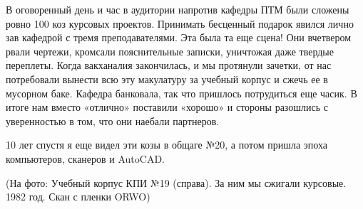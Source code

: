 В оговоренный день и час в аудитории напротив кафедры ПТМ были сложены ровно
100 коз курсовых проектов. Принимать бесценный подарок явился лично зав
кафедрой с тремя преподавателями. Эта была та еще сцена! Они вчетвером рвали
чертежи, кромсали пояснительные записки, уничтожая даже твердые переплеты.
Когда вакханалия закончилась, и мы протянули зачетки, от нас потребовали
вынести всю эту макулатуру за учебный корпус и сжечь ее в мусорном баке.
Кафедра банковала, так что пришлось потрудиться еще часик. В итоге нам вместо
«отлично» поставили «хорошо» и стороны разошлись с уверенностью в том, что они
наебали партнеров.

10 лет спустя я еще видел эти козы в общаге №20, а потом пришла эпоха
компьютеров, сканеров и AutoCAD.

(На фото: Учебный корпус КПИ №19 (справа). За ним мы сжигали курсовые. 1982
год. Скан с пленки ORWO)

